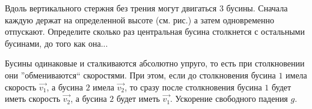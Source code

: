 Вдоль вертикального стержня без трения могут двигаться $3$ бусины. Сначала каждую держат на определенной высоте (см. рис.) а затем одновременно отпускают. Определите сколько раз центральная бусина столкнется с остальными бусинами, до того как она...

Бусины одинаковые и сталкиваются абсолютно упруго, то есть при столкновении они ''обмениваются`` скоростями. При этом, если до столкновения бусина $1$ имела скорость $\vec{v_1}$, а бусина $2$ имела $\vec{v_2}$, то сразу после столкновения бусина $1$ будет иметь скорость $\vec{v_2}$, а бусина $2$ будет иметь $\vec{v_1}$. Ускорение свободного падения $g$. 